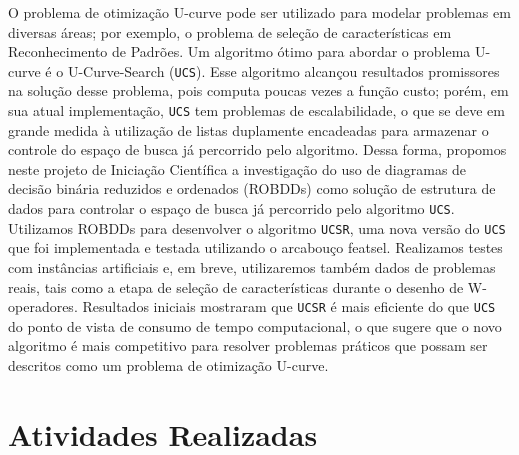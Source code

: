 \documentclass[12pt]{article}
\begin{document}
O problema de otimização U-curve pode ser utilizado para modelar problemas em diversas áreas; por exemplo, o problema de seleção de características em Reconhecimento de Padrões. Um algoritmo ótimo para abordar o problema U-curve é o U-Curve-Search ({\tt UCS}). Esse algoritmo alcançou resultados promissores na solução desse problema, pois computa poucas vezes a função custo; porém, em sua atual implementação, {\tt UCS} tem problemas de escalabilidade, o que se deve em grande medida à utilização de listas duplamente encadeadas para armazenar o controle do espaço de busca já percorrido pelo algoritmo. Dessa forma, propomos neste projeto de Iniciação Científica a investigação do uso de diagramas de decisão binária reduzidos e ordenados (ROBDDs) como solução de estrutura de dados para controlar o espaço de busca já percorrido pelo algoritmo {\tt UCS}. Utilizamos ROBDDs para desenvolver o algoritmo {\tt UCSR}, uma nova versão do {\tt UCS} que foi implementada e testada utilizando o arcabouço featsel. Realizamos testes com instâncias artificiais e, em breve, utilizaremos também dados de problemas reais, tais como a etapa de seleção de características durante o desenho de W-operadores. Resultados iniciais mostraram que {\tt UCSR} é mais eficiente do que {\tt UCS} do ponto de vista de consumo de tempo computacional, o que sugere que o novo algoritmo é mais competitivo para resolver problemas práticos que possam ser descritos como um problema de otimização U-curve.


\pagebreak

\section{Atividades Realizadas} \label{sec:atividades}  %


%
%
\end{document}
